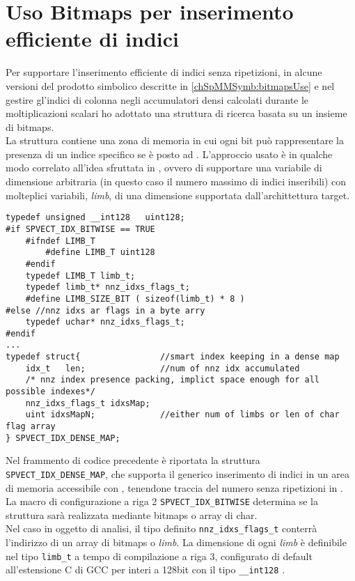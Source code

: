 \section{Uso Bitmaps per inserimento efficiente di indici} \label{chSpMMAux:bitmapInsert}
Per supportare l'inserimento efficiente di indici senza ripetizioni,
in alcune versioni del prodotto simbolico descritte in \ref{chSpMMSymb:bitmapsUse} e nel gestire gl'indici di colonna 
negli accumulatori densi calcolati durante le moltiplicazioni scalari ho adottato
una struttura di ricerca basata su un insieme di bitmaps.\\
La struttura contiene una zona di memoria in cui ogni bit può rappresentare la presenza di un indice specifico
se è posto ad .
\voidLine
L'approccio usato è in qualche modo correlato all'idea sfruttata in \cite{GMP},
ovvero di supportare una variabile di dimensione arbitraria (in questo caso il numero massimo di indici inseribili)
con molteplici variabili, \emph{limb}, di una dimensione supportata dall'archittettura target.\\
\begin{lstlisting}
typedef unsigned __int128	uint128;
#if SPVECT_IDX_BITWISE == TRUE
	#ifndef LIMB_T
		#define LIMB_T uint128
	#endif
	typedef LIMB_T limb_t;
	typedef limb_t* nnz_idxs_flags_t;
	#define LIMB_SIZE_BIT ( sizeof(limb_t) * 8 )
#else //nnz idxs ar flags in a byte arry
	typedef uchar* nnz_idxs_flags_t;
#endif
...
typedef struct{                //smart index keeping in a dense map
	idx_t	len;               //num of nnz idx accumulated
	/* nnz index presence packing, implict space enough for all possible indexes*/
	nnz_idxs_flags_t idxsMap;
	uint idxsMapN;             //either num of limbs or len of char flag array
} SPVECT_IDX_DENSE_MAP;
\end{lstlisting}
Nel frammento di codice precedente è riportata la struttura \verb|SPVECT_IDX_DENSE_MAP|, che supporta
il generico inserimento di indici in un area di memoria accessibile con , 
tenendone traccia del numero senza ripetizioni in .\\
La macro di configurazione a riga 2 \verb|SPVECT_IDX_BITWISE| determina se la struttura sarà realizzata
mediante bitmaps o array di char.\\
Nel caso in oggetto di analisi, il tipo definito \verb|nnz_idxs_flags_t| conterrà l'indirizzo
di un array di bitmaps o \emph{limb}.
\voidLine
La dimensione di ogni \emph{limb} è definibile nel tipo \verb|limb_t| a tempo di compilazione a riga 3, 
configurato di default all'estensione C di GCC per interi a 128bit con il tipo \verb|__int128| \cite{gcc10.1}.\\
